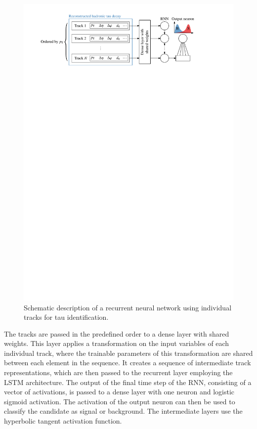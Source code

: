 \begin{figure}[htb]
  \centering
  \includegraphics[scale=0.9]{./figures/rnn/track_rnn_schematic.pdf}
  \caption{Schematic description of a recurrent neural network using individual
    tracks for tau identification.}
  \label{fig:track_rnn_schematic}
\end{figure}

The tracks are passed in the predefined order to a dense layer with shared
weights. This layer applies a transformation on the input variables of each
individual track, where the trainable parameters of this transformation are
shared between each element in the sequence. It creates a sequence of
intermediate track representations, which are then passed to the recurrent layer
employing the LSTM architecture. The output of the final time step of the RNN,
consisting of a vector of activations, is passed to a dense layer with one
neuron and logistic sigmoid activation. The activation of the output neuron can
then be used to classify the \tauhadvis candidate as signal or background. The
intermediate layers use the hyperbolic tangent activation function.

